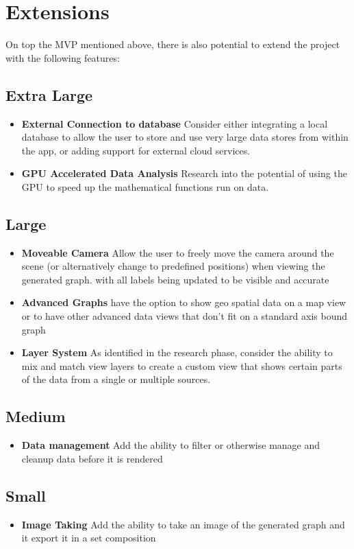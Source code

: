 \documentclass{article}
\begin{document}
\section{Extensions}

On top the MVP mentioned above, there is also potential to extend the project with the following features:

\subsection{Extra Large}
\begin{itemize}
    \item \textbf{External Connection to database} Consider either integrating a local database to allow the user to store and use very large data stores from within the app, or adding support for external cloud services. 
    \item \textbf{GPU Accelerated Data Analysis} Research into the potential of using the GPU to speed up the mathematical functions run on data.
\end{itemize}
\subsection{Large}
\begin{itemize}
    \item \textbf{Moveable Camera} Allow the user to freely move the camera around the scene (or alternatively change to predefined positions) when viewing the generated graph. with all labels being updated to be visible and accurate
    \item \textbf{Advanced Graphs} have the option to show geo spatial data on a map view or to have other advanced data views that don't fit on a standard axis bound graph
    \item \textbf{Layer System} As identified in the research phase, consider the ability to mix and match view layers to create a custom view that shows certain parts of the data from a single or multiple sources. 
\end{itemize}
\subsection{Medium}
\begin{itemize}
    \item \textbf{Data management} Add the ability to filter or otherwise manage and cleanup data before it is rendered
\end{itemize}
\subsection{Small}
\begin{itemize}
    \item \textbf{Image Taking} Add the ability to take an image of the generated graph and it export it in a set composition 
\end{itemize}
\end{document}
